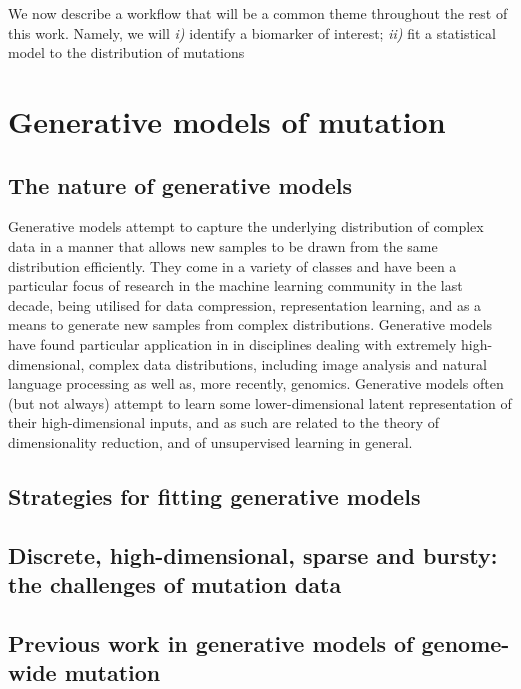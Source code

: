 \documentclass[../thesis.tex]{subfiles}
\begin{document}
We now describe a workflow that will be a common theme throughout the rest of this work. Namely, we will \textit{i)} identify a biomarker of interest; \textit{ii)} fit a statistical model to the distribution of mutations 

\section{Generative models of mutation}


\subsection{The nature of generative models}
Generative models attempt to capture the underlying distribution of complex data in a manner that allows new samples to be drawn from the same distribution efficiently. They come in a variety of classes and have been a particular focus of research in the machine learning community in the last decade, being utilised for data compression, representation learning, and as a means to generate new samples from complex distributions. Generative models have found particular application in  in disciplines dealing with extremely high-dimensional, complex data distributions, including image analysis and natural language processing as well as, more recently, genomics. Generative models often (but not always) attempt to learn some lower-dimensional latent representation of their high-dimensional inputs, and as such are related to the theory of dimensionality reduction, and of unsupervised learning in general. 



\subsection{Strategies for fitting generative models}


\subsection{Discrete, high-dimensional, sparse and bursty: the challenges of mutation data}

\citep{zhao_variational_2020}

\subsection{Previous work in generative models of genome-wide mutation}
\citep{budczies_cutoff_2012} \citep{yao_ectmb_2020} \citep{fantini_mutsignatures_2020}
\end{document}
